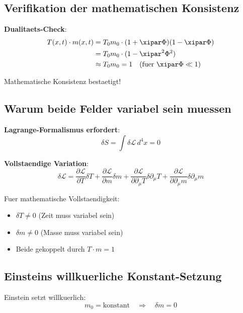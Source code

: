 	\subsection{Verifikation der mathematischen Konsistenz}
	
	\textbf{Dualitaets-Check}:
	\begin{align}
		T(x,t) \cdot m(x,t) &= T_0 m_0 \cdot (1 + \xipar \Phi)(1 - \xipar \Phi) \\
		&= T_0 m_0 \cdot (1 - \xipar^2 \Phi^2) \\
		&\approx T_0 m_0 = 1 \quad \text{(fuer } \xipar \Phi \ll 1\text{)}
	\end{align}
	
	Mathematische Konsistenz bestaetigt!
	
	\subsection{Warum beide Felder variabel sein muessen}
	
	\textbf{Lagrange-Formalismus erfordert}:
	\begin{equation}
		\delta S = \int \delta \mathcal{L} \, d^4x = 0
	\end{equation}
	
	\textbf{Vollstaendige Variation}:
	\begin{equation}
		\delta \mathcal{L} = \frac{\partial \mathcal{L}}{\partial T}\delta T + \frac{\partial \mathcal{L}}{\partial m}\delta m + \frac{\partial \mathcal{L}}{\partial \partial_\mu T}\delta \partial_\mu T + \frac{\partial \mathcal{L}}{\partial \partial_\mu m}\delta \partial_\mu m
	\end{equation}
	
	Fuer mathematische Vollstaendigkeit:
	\begin{itemize}
		\item $\delta T \neq 0$ (Zeit muss variabel sein)
		\item $\delta m \neq 0$ (Masse muss variabel sein)
		\item Beide gekoppelt durch $T \cdot m = 1$
	\end{itemize}
	
	\subsection{Einsteins willkuerliche Konstant-Setzung}
	
	Einstein setzt willkuerlich:
	\begin{equation}
		m_0 = \text{konstant} \quad \Rightarrow \quad \delta m = 0
	\end{equation}
	
